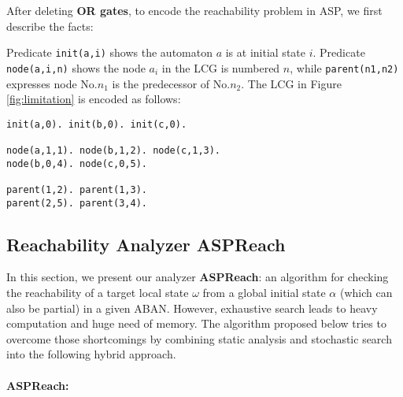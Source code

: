 After deleting \textbf{OR gates}, to encode the reachability problem in ASP, we first describe the facts:

Predicate \texttt{init(a,i)} shows the automaton $a$ is at initial state $i$. %
Predicate \texttt{node(a,i,n)} shows the node $a_i$ in the LCG is numbered $n$, while \texttt{parent(n1,n2)} expresses node No.$n_1$ is the predecessor of No.$n_2$.
The LCG in Figure \ref{fig:limitation} is encoded as follows:
\begin{Verbatim}[commandchars=\\\{\}]
init(a,0). init(b,0). init(c,0).

node(a,1,1). node(b,1,2). node(c,1,3).
node(b,0,4). node(c,0,5).

parent(1,2). parent(1,3).
parent(2,5). parent(3,4).
\end{Verbatim}
\subsection{Reachability Analyzer ASPReach}
In this section, we present our analyzer \textbf{ASPReach}: an algorithm for checking the reachability of a target local state $\omega$ from a global initial state $\alpha$ (which can also be partial) in a given ABAN.
However, exhaustive search leads to heavy computation and huge need of memory.
The algorithm proposed below tries to overcome those shortcomings by combining static analysis and stochastic search into the following hybrid approach.


\paragraph{{\bf ASPReach}:}

